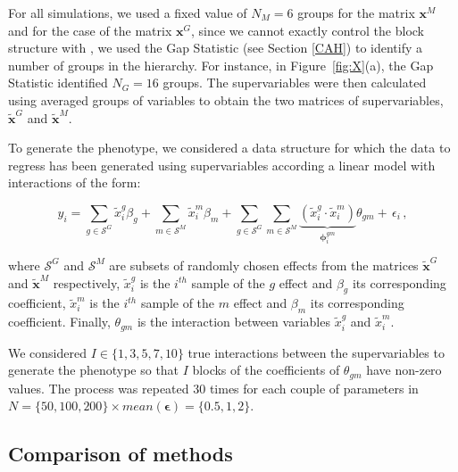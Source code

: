 \documentclass[]{book}
\begin{document}
For all simulations, we used a fixed value of \(N_{\mathit{M}} = 6\) groups for
the matrix \(\mathbf{x}^{\mathit{M}}\) and for the case of the matrix \(\mathbf{x}^{\mathit{G}}\), since
we cannot exactly control the block structure with , we used the Gap
Statistic (see Section \ref{CAH}) to identify a number of groups in
the hierarchy. For instance, in Figure~\ref{fig:X}(a), the Gap Statistic
identified \(N_{\mathit{G}} = 16\) groups. The supervariables were then
calculated using averaged groups of variables to obtain the two matrices
of supervariables, \(\tilde{\mathbf{x}}^{\mathit{G}}\) and \(\tilde{\mathbf{x}}^{\mathit{M}}\).

To generate the phenotype, we considered a data structure for which the
data to regress has been generated using supervariables according a
linear model with interactions of the form:

\[\label{eq:phenotype_gen}
  y_i = 
  \sum_{g \in \mathcal{S}^{\mathit{G}}}\tilde{x}_i^g \beta_{g} +
  \sum_{m \in \mathcal{S}^{\mathit{M}}} \tilde{x}_i^m \beta_{m} +
  \sum_{g \in \mathcal{S}^{\mathit{G}}}\sum_{m \in \mathcal{S}^{\mathit{M}}}
  \underbrace{\left(\tilde{x}_i^g  \cdot
      \tilde{x}_i^m\right)}_{\boldsymbol{\phi}^{gm}_i}
  {\theta_{gm}} + \, \epsilon_i \,,\]

where \(\mathcal{S}^{\mathit{G}}\) and \(\mathcal{S}^{\mathit{M}}\) are subsets of randomly chosen effects from the matrices \(\tilde{\mathbf{x}}^{\mathit{G}}\) and \(\tilde{\mathbf{x}}^{\mathit{M}}\) respectively, \(\tilde{x}_i^g\) is the \(i^{th}\) sample of the \(g\) effect and \(\beta_{g}\) its corresponding coefficient, \(\tilde{x}_i^m\) is the \(i^{th}\) sample of the \(m\) effect and \(\beta_{m}\) its corresponding coefficient. Finally, \(\theta_{gm}\) is the interaction between variables \(\tilde{x}_i^g\) and \(\tilde{x}_i^m\).

We considered \(I \in \{1,3,5,7,10\}\) true interactions between the
supervariables to generate the phenotype so that \(I\) blocks of the
coefficients of \(\theta_{gm}\) have non-zero values. The process
was repeated 30 times for each couple of parameters in
\(N=\{50, 100, 200\} \times mean(\boldsymbol{\epsilon})=\{0.5, 1, 2\}\).

\hypertarget{comparison-of-methods}{%
\subsection{Comparison of methods}\label{comparison-of-methods}}
\end{document}
